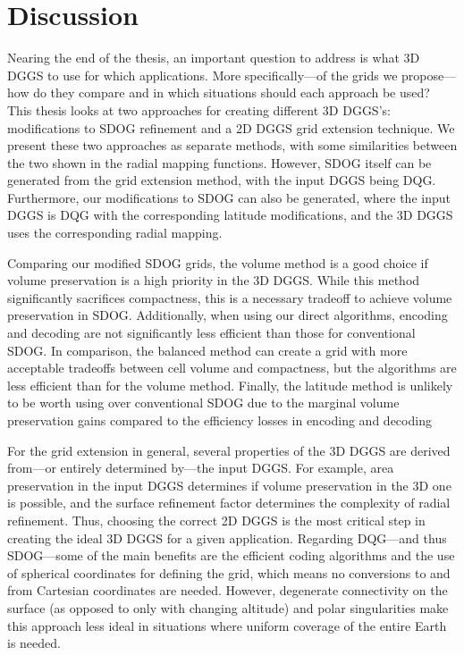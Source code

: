 \chapter{Discussion} \label{chap:discussion}
Nearing the end of the thesis, an important question to address is what 3D DGGS to use for which applications.
More specifically---of the grids we propose---how do they compare and in which situations should each approach be used?
This thesis looks at two approaches for creating different 3D DGGS's: modifications to SDOG refinement and a 2D DGGS grid extension technique.
We present these two approaches as separate methods, with some similarities between the two shown in the radial mapping functions.
However, SDOG itself can be generated from the grid extension method, with the input DGGS being DQG.
Furthermore, our modifications to SDOG can also be generated, where the input DGGS is DQG with the corresponding latitude modifications, and the 3D DGGS uses the corresponding radial mapping.


Comparing our modified SDOG grids, the volume method is a good choice if volume preservation is a high priority in the 3D DGGS.
While this method significantly sacrifices compactness, this is a necessary tradeoff to achieve volume preservation in SDOG. Additionally, when using our direct algorithms, encoding and decoding are not significantly less efficient than those for conventional SDOG.
In comparison, the balanced method can create a grid with more acceptable tradeoffs between cell volume and compactness, but the algorithms are less efficient than for the volume method.
Finally, the latitude method is unlikely to be worth using over conventional SDOG due to the marginal volume preservation gains compared to the efficiency losses in encoding and decoding


For the grid extension in general, several properties of the 3D DGGS are derived from---or entirely determined by---the input DGGS.
For example, area preservation in the input DGGS determines if volume preservation in the 3D one is possible, and the surface refinement factor determines the complexity of radial refinement.
Thus, choosing the correct 2D DGGS is the most critical step in creating the ideal 3D DGGS for a given application.
Regarding DQG---and thus SDOG---some of the main benefits are the efficient coding algorithms and the use of spherical coordinates for defining the grid, which means no conversions to and from Cartesian coordinates are needed.
However, degenerate connectivity on the surface (as opposed to only with changing altitude) and polar singularities make this approach less ideal in situations where uniform coverage of the entire Earth is needed.


